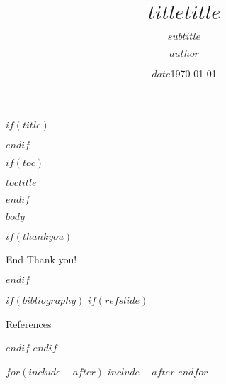 \documentclass[$if(handout)$handout,$endif$,$if(aspectratio)$aspectratio=$aspectratio$$endif$]{beamer}
\author{$author$}
\title{$title$}
\title{$title$}
\subtitle{$subtitle$}
\institute{$institute$}
\date{$date$}
\date{\today}
\begin{document}
$if(title)$
\begin{frame}
	\titlepage
\end{frame}
$endif$

$if(toc)$
\begin{frame}[allowframebreaks=0.8]{$toctitle$}
	\tableofcontents
\end{frame}
$endif$

$body$

$if(thankyou)$
\begin{frame}{End}
	\centering
	\Huge Thank you!
\end{frame}
$endif$

$if(bibliography)$
$if(refslide)$
\begin{frame}{References}
	\printbibliography[heading=none]
\end{frame}
$endif$
$endif$

$for(include-after)$
$include-after$
$endfor$
\end{document}
